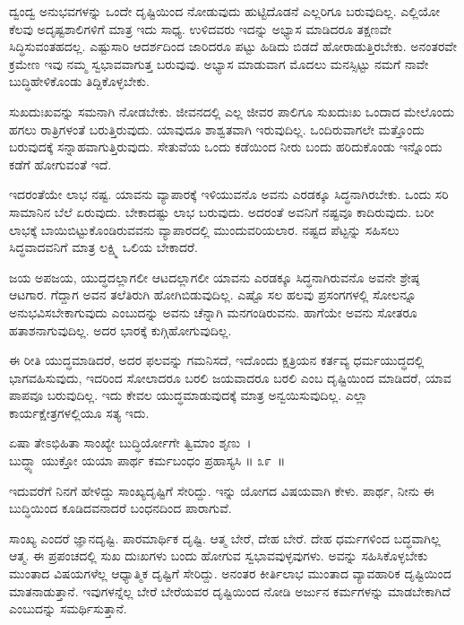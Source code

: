 ದ್ವಂದ್ವ ಅನುಭವಗಳನ್ನು ಒಂದೇ ದೃಷ್ಟಿಯಿಂದ ನೋಡುವುದು ಹುಟ್ಟಿದೊಡನೆ ಎಲ್ಲರಿಗೂ ಬರುವುದಿಲ್ಲ. ಎಲ್ಲಿಯೋ ಕೆಲವು ಅದೃಷ್ಟಶಾಲಿಗಳಿಗೆ ಮಾತ್ರ ಇದು ಸಾಧ್ಯ. ಉಳಿದವರು ಇದನ್ನು ಅಭ್ಯಾಸ ಮಾಡಿದರೂ ತಕ್ಷಣವೇ ಸಿದ್ಧಿಸುವಂತಹದಲ್ಲ. ಎಷ್ಟುಸಾರಿ ಆದರ್ಶದಿಂದ ಜಾರಿದರೂ ಪಟ್ಟು ಹಿಡಿದು ಬಿಡದೆ ಹೋರಾಡುತ್ತಿರಬೇಕು. ಅನಂತರವೇ ಕ್ರಮೇಣ ಇವು ನಮ್ಮ ಸ್ವಭಾವವಾಗುತ್ತ ಬರುವುವು. ಅಭ್ಯಾಸ ಮಾಡುವಾಗ ಮೊದಲು ಮನಸ್ಸಿಟ್ಟು ನಮಗೆ ನಾವೇ ಬುದ್ಧಿಹೇಳಿಕೊಂಡು ತಿದ್ದಿಕೊಳ್ಳಬೇಕು.

ಸುಖದುಃಖವನ್ನು ಸಮನಾಗಿ ನೋಡಬೇಕು. ಜೀವನದಲ್ಲಿ ಎಲ್ಲ ಜೀವರ ಪಾಲಿಗೂ ಸುಖದುಃಖ ಒಂದಾದ ಮೇಲೊಂದು ಹಗಲು ರಾತ್ರಿಗಳಂತೆ ಬರುತ್ತಿರುವುದು. ಯಾವುದೂ ಶಾಶ್ವತವಾಗಿ ಇರುವುದಿಲ್ಲ. ಒಂದಿರುವಾಗಲೇ ಮತ್ತೊಂದು ಬರುವುದಕ್ಕೆ ಸನ್ನಾಹವಾಗುತ್ತಿರುವುದು. ಸೇತುವೆಯ ಒಂದು ಕಡೆಯಿಂದ ನೀರು ಬಂದು ಹರಿದುಕೊಂಡು ಇನ್ನೊಂದು ಕಡೆಗೆ ಹೋಗುವಂತೆ ಇದೆ.

ಇದರಂತೆಯೇ ಲಾಭ ನಷ್ಟ. ಯಾವನು ವ್ಯಾಪಾರಕ್ಕೆ ಇಳಿಯುವನೊ ಅವನು ಎರಡಕ್ಕೂ ಸಿದ್ಧನಾಗಿರಬೇಕು. ಒಂದು ಸರಿ ಸಾಮಾನಿನ ಬೆಲೆ ಏರುವುದು. ಬೇಕಾದಷ್ಟು ಲಾಭ ಬರುವುದು. ಅದರಂತೆ ಅವನಿಗೆ ನಷ್ಟವೂ ಕಾದಿರುವುದು. ಬರೀ ಲಾಭಕ್ಕೆ ಬಾಯಿಬಿಟ್ಟುಕೊಂಡಿರುವವನು ವ್ಯಾಪಾರದಲ್ಲಿ ಮುಂದುವರಿಯಲಾರ. ನಷ್ಟದ ಪೆಟ್ಟನ್ನು ಸಹಿಸಲು ಸಿದ್ಧವಾದವನಿಗೆ ಮಾತ್ರ ಲಕ್ಷ್ಮಿ ಒಲಿಯ ಬೇಕಾದರೆ.

ಜಯ ಅಪಜಯ, ಯುದ್ಧದಲ್ಲಾಗಲೀ ಆಟದಲ್ಲಾಗಲೀ ಯಾವನು ಎರಡಕ್ಕೂ ಸಿದ್ಧನಾಗಿರು\-ವನೊ ಅವನೇ ಶ್ರೇಷ್ಠ ಆಟಗಾರ. ಗೆದ್ದಾಗ ಅವನ ತಲೆತಿರುಗಿ ಹೋಗಿಬಿಡುವುದಿಲ್ಲ. ಎಷ್ಟೊ ಸಲ ಹಲವು ಪ್ರಸಂಗಗಳಲ್ಲಿ ಸೋಲನ್ನೂ ಅನುಭವಿಸಬೇಕಾಗುವುದು ಎಂಬುದನ್ನು ಅವನು ಚೆನ್ನಾಗಿ ಮನಗಂಡಿರುವನು. ಹಾಗೆಯೇ ಅವನು ಸೋತರೂ ಹತಾಶನಾಗುವುದಿಲ್ಲ. ಅದರ ಭಾರಕ್ಕೆ ಕುಗ್ಗಿಹೋಗುವುದಿಲ್ಲ.

ಈ ರೀತಿ ಯುದ್ಧಮಾಡಿದರೆ, ಅದರ ಫಲವನ್ನು ಗಮನಿಸದೆ, ಇದೊಂದು ಕ್ಷತ್ರಿಯನ ಕರ್ತವ್ಯ ಧರ್ಮಯುದ್ಧದಲ್ಲಿ ಭಾಗವಹಿಸುವುದು, ಇದರಿಂದ ಸೋಲಾದರೂ ಬರಲಿ ಜಯವಾದರೂ ಬರಲಿ ಎಂಬ ದೃಷ್ಟಿಯಿಂದ ಮಾಡಿದರೆ, ಯಾವ ಪಾಪವೂ ಬರುವುದಿಲ್ಲ. ಇದು ಕೇವಲ ಯುದ್ಧಮಾಡುವುದಕ್ಕೆ ಮಾತ್ರ ಅನ್ವಯಿಸುವುದಿಲ್ಲ. ಎಲ್ಲಾ ಕಾರ್ಯಕ್ಷೇತ್ರಗಳಲ್ಲಿಯೂ ಸತ್ಯ ಇದು.

\begin{shloka}
ಏಷಾ ತೇಽಭಿಹಿತಾ ಸಾಂಖ್ಯೇ ಬುದ್ಧಿರ್ಯೋಗೇ ತ್ವಿಮಾಂ ಶೃಣು~।\\ಬುದ್ಧ್ಯಾ ಯುಕ್ತೋ ಯಯಾ ಪಾರ್ಥ ಕರ್ಮಬಂಧಂ ಪ್ರಹಾಸ್ಯಸಿ \hfill॥ ೩೯~॥
\end{shloka}

\begin{artha}
ಇದುವರೆಗೆ ನಿನಗೆ ಹೇಳಿದ್ದು ಸಾಂಖ್ಯದೃಷ್ಟಿಗೆ ಸೇರಿದ್ದು. ಇನ್ನು ಯೋಗದ ವಿಷಯವಾಗಿ ಕೇಳು. ಪಾರ್ಥ, ನೀನು ಈ ಬುದ್ಧಿಯಿಂದ ಕೂಡಿದವನಾದರೆ ಬಂಧನದಿಂದ ಪಾರಾಗುವೆ.
\end{artha}

ಸಾಂಖ್ಯ ಎಂದರೆ ಜ್ಞಾನದೃಷ್ಟಿ. ಪಾರಮಾರ್ಥಿಕ ದೃಷ್ಟಿ. ಆತ್ಮ ಬೇರೆ, ದೇಹ ಬೇರೆ. ದೇಹ ಧರ್ಮಗಳಿಂದ ಬದ್ಧವಾಗಿಲ್ಲ ಆತ್ಮ. ಈ ಪ್ರಪಂಚದಲ್ಲಿ ಸುಖ ದುಃಖಗಳು ಬಂದು ಹೋಗುವ ಸ್ವಭಾವವುಳ್ಳವುಗಳು. ಅವನ್ನು ಸಹಿಸಿಕೊಳ್ಳಬೇಕು ಮುಂತಾದ ವಿಷಯಗಳೆಲ್ಲ ಆಧ್ಯಾತ್ಮಿಕ ದೃಷ್ಟಿಗೆ ಸೇರಿದ್ದು. ಅನಂತರ ಕೀರ್ತಿಲಾಭ ಮುಂತಾದ ವ್ಯಾವಹಾರಿಕ ದೃಷ್ಟಿಯಿಂದ ಮಾತನಾಡುತ್ತಾನೆ. ಇವುಗಳನ್ನೆಲ್ಲ ಬೇರೆ ಬೇರೆಯವರ ದೃಷ್ಟಿಯಿಂದ ನೋಡಿ ಅರ್ಜುನ ಕರ್ಮಗಳನ್ನು ಮಾಡಬೇಕಾಗಿದೆ ಎಂಬುದನ್ನು ಸಮರ್ಥಿಸುತ್ತಾನೆ.


